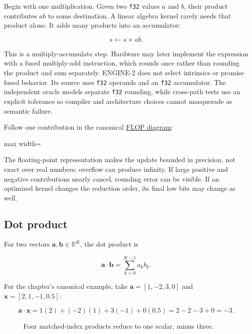 \documentclass[
  10pt,
]{article}
\begin{document}
Begin with one multiplication. Given two \texttt{f32} values \(a\) and
\(b\), their product contributes \(ab\) to some destination. A linear
algebra kernel rarely needs that product alone. It adds many products
into an accumulator:

\[
s \leftarrow s + ab.
\]

This is a multiply-accumulate step. Hardware may later implement the
expression with a fused multiply-add instruction, which rounds once
rather than rounding the product and sum separately. ENGINE-2 does not
select intrinsics or promise fused behavior. Its source uses
\texttt{f32} operands and an \texttt{f32} accumulator. The independent
oracle models separate \texttt{f32} rounding, while cross-path tests use
an explicit tolerance so compiler and architecture choices cannot
masquerade as semantic failure.

Follow one contribution in the canonical
\href{https://github.com/hermonai/inside-the-llm-engine/blob/astra-visual-rewrite/diagrams/linear/follow-the-flop.txt}{FLOP
diagram}:

\begin{center}\begin{adjustbox}{max width=\linewidth}\end{adjustbox}\end{center}

The floating-point representation makes the update bounded in precision,
not exact over real numbers; overflow can produce infinity. If large
positive and negative contributions nearly cancel, rounding error can be
visible. If an optimized kernel changes the reduction order, its final
low bits may change as well.

\subsection{Dot product}\label{dot-product}

For two vectors \(\mathbf{a},\mathbf{b}\in\mathbb{R}^{K}\), the dot
product is

\[
\mathbf{a}\cdot\mathbf{b}
=\sum_{k=0}^{K-1}a_kb_k.
\]

For the chapter's canonical example, take \(\mathbf{a}=[1,-2,3,0]\) and
\(\mathbf{x}=[2,1,-1,0.5]\):

\[
\mathbf{a}\cdot\mathbf{x}
=1(2)+(-2)(1)+3(-1)+0(0.5)
=2-2-3+0=-3.
\]

\begin{figure}[H]\centering\resizebox{\linewidth}{!}{}\caption{Four matched-index products reduce to one scalar, minus three.}\end{figure}
\end{document}
